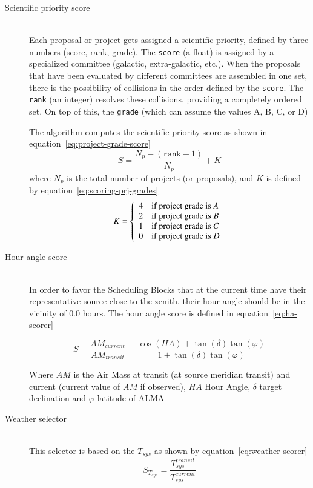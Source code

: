 \begin{description}
\item[Scientific priority score] \hfill \\
Each proposal or project gets assigned a scientific priority, defined by three numbers
(score, rank, grade). The \texttt{score} (a float) is assigned by
a specialized committee (galactic, extra-galactic, etc.). When the proposals that have
been evaluated by different committees are assembled in one set, there is the possibility
of collisions in the order defined by the \texttt{score}. The \texttt{rank} (an integer) resolves these
collisions, providing a completely ordered set. On top of this, the \texttt{grade} (which can assume
the values A, B, C, or D)

The algorithm computes the scientific priority score as shown in equation~\ref{eq:project-grade-score}
\begin{equation}
\label{eq:project-grade-score}
S = \frac{N_p - (\mathtt{rank} - 1)}{N_p} + K
\end{equation}
where $N_p$ is the total number of projects (or proposals), and $K$ is defined by equation~\ref{eq:scoring-prj-grades}
\begin{equation}
\label{eq:scoring-prj-grades}
K = \left\{
    \begin{array}{l l}
    4 & \mbox{if project grade is $A$} \\
    2 & \mbox{if project grade is $B$} \\
    1 & \mbox{if project grade is $C$} \\
    0 & \mbox{if project grade is $D$}
    \end{array} \right . 
\end{equation}

\item[Hour angle score] \hfill \\
In order to favor the Scheduling Blocks that at the current time have their representative source close to the zenith, 
their hour angle should be in the vicinity of $0.0$ hours. The hour angle score is defined in equation~\ref{eq:ha-scorer}

\begin{equation}
\label{eq:ha-scorer}
	S = \frac{AM_{current}}{AM_{transit}} = \frac{\cos(HA) + \tan(\delta) \tan(\varphi)}
											{1 + \tan(\delta) \tan(\varphi)}
\end{equation}

Where $AM$ is the Air Mass at transit (at source meridian transit) and current (current value of $AM$ if observed), $HA$ Hour Angle, $\delta$ target declination and $\varphi$ latitude of ALMA

\item[Weather selector] \hfill \\
This selector is based on the $T_{sys}$ as shown by equation~\ref{eq:weather-scorer}
\begin{equation}
\label{eq:weather-scorer}
	S_{T_{sys}} = \frac{T_{sys}^{transit}}{T_{sys}^{current}}
\end{equation}
\end{description}

